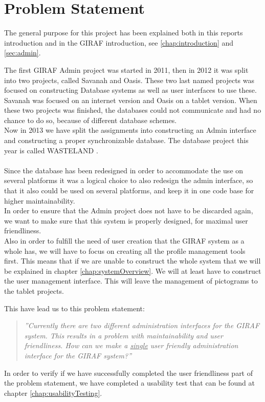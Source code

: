 \chapter{Problem Statement}
The general purpose for this project has been explained both in this reports introduction and in the GIRAF introduction, see \ref{chap:introduction} and \ref{sec:admin}.

The first GIRAF Admin project was started in 2011, then in 2012 it was split into two projects, called Savanah and Oasis. These two last named projects was focused on constructing Database systems as well as user interfaces to use these. Savanah was focused on an internet version and Oasis on a tablet version. When these two projects was finished, the databases could not communicate and had no chance to do so, because of different database schemes.\\
Now in 2013 we have split the assignments into constructing an Admin interface and constructing a proper synchronizable database. The database project this year is called WASTELAND \citep{wasteland}.\\
\\
Since the database has been redesigned in order to accommodate the use on several platforms it was a logical choice to also redesign the admin interface, so that it also could be used on several platforms, and keep it in one code base for higher maintainability.\\
In order to ensure that the Admin project does not have to be discarded again, we want to make sure that this system is properly designed, for maximal user friendliness.\\
Also in order to fulfill the need of user creation that the GIRAF system as a whole has, we will have to focus on creating all the profile management tools first. This means that if we are unable to construct the whole system that we will be explained in chapter \vref{chap:systemOverview}. We will at least have to construct the user management interface. This will leave the management of pictograms to the tablet projects.

This have lead us to this problem statement:
\begin{verse}
\textit{''Currently there are two different administration interfaces for the GIRAF system.
This results in a problem with maintainability and user friendliness.
How can we make a \underline{single} user friendly administration interface for the GIRAF system?''}
\end{verse}

In order to verify if we have successfully completed the user friendliness part of the problem statement, we have completed a usability test that can be found at chapter \vref{chap:usabilityTesting}.

